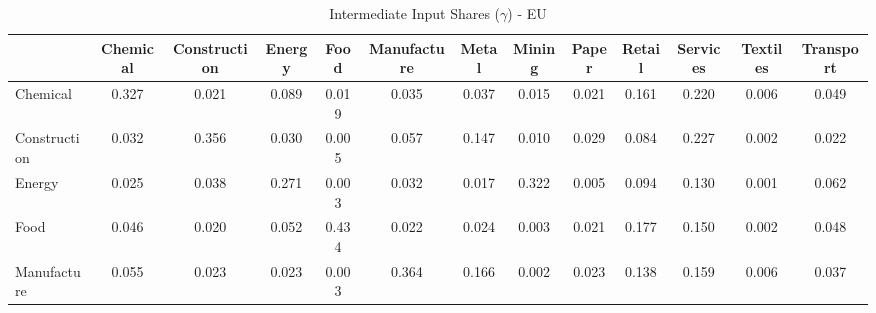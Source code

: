 \begin{table}[htbp]
\centering
\caption{Intermediate Input Shares ($\gamma$) - EU} 
\label{tab:gamma_EU}
\begin{tabular}{lcccccccccccc}
  \hline
 & Chemical & Construction & Energy & Food & Manufacture & Metal & Mining & Paper & Retail & Services & Textiles & Transport \\ 
  \hline
Chemical & \textcolor[RGB]{12,8,243}{0.327} & \textcolor[RGB]{181,117,74}{0.021} & \textcolor[RGB]{73,47,182}{0.089} & \textcolor[RGB]{188,121,67}{0.019} & \textcolor[RGB]{138,89,117}{0.035} & \textcolor[RGB]{133,86,122}{0.037} & \textcolor[RGB]{195,126,60}{0.015} & \textcolor[RGB]{182,118,73}{0.021} & \textcolor[RGB]{35,23,220}{0.161} & \textcolor[RGB]{25,16,230}{0.220} & \textcolor[RGB]{214,139,41}{0.006} & \textcolor[RGB]{113,73,142}{0.049} \\ 
  Construction & \textcolor[RGB]{140,91,115}{0.032} & \textcolor[RGB]{11,7,244}{0.356} & \textcolor[RGB]{151,97,104}{0.030} & \textcolor[RGB]{220,142,35}{0.005} & \textcolor[RGB]{94,61,161}{0.057} & \textcolor[RGB]{42,27,212}{0.147} & \textcolor[RGB]{209,135,46}{0.010} & \textcolor[RGB]{156,101,99}{0.029} & \textcolor[RGB]{78,50,177}{0.084} & \textcolor[RGB]{23,15,232}{0.227} & \textcolor[RGB]{243,157,12}{0.002} & \textcolor[RGB]{179,116,76}{0.022} \\ 
  Energy & \textcolor[RGB]{163,105,92}{0.025} & \textcolor[RGB]{131,85,124}{0.038} & \textcolor[RGB]{19,13,236}{0.271} & \textcolor[RGB]{228,148,27}{0.003} & \textcolor[RGB]{142,92,113}{0.032} & \textcolor[RGB]{191,124,64}{0.017} & \textcolor[RGB]{16,10,239}{0.322} & \textcolor[RGB]{221,143,34}{0.005} & \textcolor[RGB]{71,46,184}{0.094} & \textcolor[RGB]{55,36,200}{0.130} & \textcolor[RGB]{253,164,2}{0.001} & \textcolor[RGB]{90,58,165}{0.062} \\ 
  Food & \textcolor[RGB]{120,78,135}{0.046} & \textcolor[RGB]{186,120,69}{0.020} & \textcolor[RGB]{104,68,151}{0.052} & \textcolor[RGB]{2,1,253}{0.434} & \textcolor[RGB]{177,115,78}{0.022} & \textcolor[RGB]{166,108,89}{0.024} & \textcolor[RGB]{232,150,23}{0.003} & \textcolor[RGB]{184,119,71}{0.021} & \textcolor[RGB]{32,21,223}{0.177} & \textcolor[RGB]{41,26,214}{0.150} & \textcolor[RGB]{239,155,16}{0.002} & \textcolor[RGB]{117,76,138}{0.048} \\ 
  Manufacture & \textcolor[RGB]{97,63,158}{0.055} & \textcolor[RGB]{168,109,87}{0.023} & \textcolor[RGB]{175,113,80}{0.023} & \textcolor[RGB]{230,149,25}{0.003} & \textcolor[RGB]{9,6,246}{0.364} & \textcolor[RGB]{34,22,221}{0.166} & \textcolor[RGB]{236,152,19}{0.002} & \textcolor[RGB]{172,111,83}{0.023} & \textcolor[RGB]{50,32,205}{0.138} & \textcolor[RGB]{37,24,218}{0.159} & \textcolor[RGB]{212,138,42}{0.006} & \textcolor[RGB]{135,87,120}{0.037} \\ 

\end{tabular}
\end{table}
